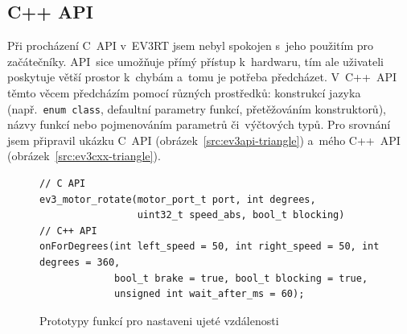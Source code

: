\subsection{C++ API}


Při procházení C~API v~EV3RT jsem nebyl spokojen s~jeho použitím pro začátečníky. 
API~sice umožňuje přímý přístup k~hardwaru, tím ale uživateli poskytuje větší prostor k~chybám a~tomu
 je potřeba předcházet. 
% 
% 
%
%
%
%
V~C++~API těmto věcem předcházím pomocí různých prostředků: konstrukcí jazyka (např.~\texttt{enum class}, defaultní parametry funkcí, přetěžováním konstruktorů), názvy funkcí nebo pojmenováním parametrů či~výčtových typů.
Pro srovnání jsem připravil ukázku C~API (obrázek~\ref{src:ev3api-triangle}) a~mého C++~API (obrázek~\ref{src:ev3cxx-triangle}). 

% 
% 

\begin{figure}[H] 
    \begin{verbatim}
// C API
ev3_motor_rotate(motor_port_t port, int degrees, 
                 uint32_t speed_abs, bool_t blocking)
// C++ API
onForDegrees(int left_speed = 50, int right_speed = 50, int degrees = 360, 
             bool_t brake = true, bool_t blocking = true, 
             unsigned int wait_after_ms = 60);
    \end{verbatim}
    \caption{Prototypy funkcí pro nastaveni ujeté vzdálenosti}
    \label{src:ev3api-ev3cxx_motor-rotate}
\end{figure}

